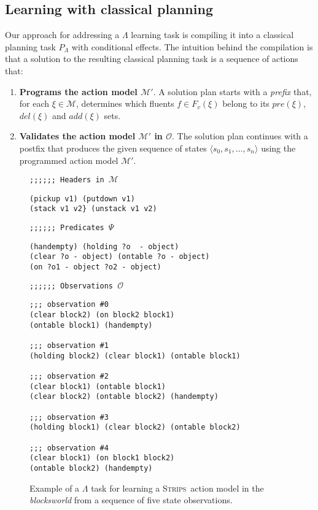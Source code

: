 \documentclass{article}
\newcommand{\tup}[1]{{\langle #1 \rangle}}
\newcommand{\strips}{\textsc{Strips}}     %
\begin{document}
\subsection{Learning with classical planning}

Our approach for addressing a $\Lambda$ learning task is compiling it into a classical planning task $P_{\Lambda}$ with conditional effects. The intuition behind the compilation is that a solution to the resulting classical planning task is a sequence of actions that:

\begin{enumerate}
\item {\bf Programs the action model $\mathcal{M}'$}. A solution plan starts with a {\em prefix} that, for each $\xi\in\mathcal{M}$, determines which fluents $f\in F_v(\xi)$ belong to its $pre(\xi)$, $del(\xi)$ and $add(\xi)$ sets.
\item {\bf Validates the action model $\mathcal{M}'$ in $\mathcal{O}$}. The solution plan continues with a postfix that produces the given sequence of states $\tup{s_0,s_1,\ldots,s_{n}}$ using the programmed action model $\mathcal{M}'$.
\end{enumerate}

\begin{figure}
{\footnotesize\tt ;;;;;; Headers in $\mathcal{M}$}
\begin{footnotesize}
\begin{verbatim}
(pickup v1) (putdown v1)
(stack v1 v2} (unstack v1 v2)
\end{verbatim}
\end{footnotesize}
\vspace{0.2cm}
{\footnotesize\tt ;;;;;; Predicates $\Psi$}
\begin{footnotesize}
\begin{verbatim}
(handempty) (holding ?o  - object)
(clear ?o - object) (ontable ?o - object)
(on ?o1 - object ?o2 - object)
\end{verbatim}
\end{footnotesize}
\vspace{0.2cm}
{\footnotesize\tt ;;;;;; Observations $\mathcal{O}$}
\begin{footnotesize}
\begin{verbatim}
;;; observation #0
(clear block2) (on block2 block1)
(ontable block1) (handempty)

;;; observation #1
(holding block2) (clear block1) (ontable block1)

;;; observation #2
(clear block1) (ontable block1)
(clear block2) (ontable block2) (handempty)

;;; observation #3
(holding block1) (clear block2) (ontable block2)

;;; observation #4
(clear block1) (on block1 block2)
(ontable block2) (handempty)
\end{verbatim}
\end{footnotesize}
 \caption{\small Example of a $\Lambda$ task for learning a \strips\ action model in the {\em blocksworld} from a sequence of five state observations.}
\label{fig:lexample}
\end{figure}
\end{document}
